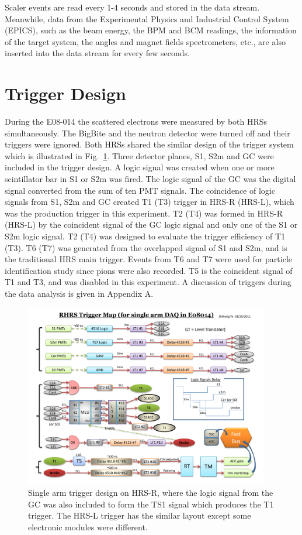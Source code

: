    Scaler events are read every 1-4 seconds and stored in the data stream. Meanwhile, data from the Experimental Physics and Industrial Control System (EPICS), such as the beam energy, the BPM and BCM readings, the information of the target system, the angles and magnet fields spectrometers, etc., are also inserted into the data stream for every few seconds.

\section{Trigger Design}
  During the E08-014 the scattered electrons were measured by both HRSs simultaneously. The BigBite and the neutron detector were turned off and their triggers were ignored. Both HRSs shared the similar design of the trigger system which is illustrated in Fig.~\ref{trigger_design}. Three detector planes, S1, S2m and GC were included in the trigger design. A logic signal was created when one or more scintillator bar in S1 or S2m was fired. The logic signal of the GC was the digital signal converted from the sum of ten PMT signals. The coincidence of logic signals from S1, S2m and GC created T1 (T3) trigger in HRS-R (HRS-L), which was the production trigger in this experiment. T2 (T4) was formed in HRS-R (HRS-L) by the coincident signal of the GC logic signal and only one of the S1 or S2m logic signal. T2 (T4) was designed to evaluate the trigger efficiency of T1 (T3). T6 (T7) was generated from the overlapped signal of S1 and S2m, and is the traditional HRS main trigger. Events from T6 and T7 were used for particle identification study since pions were also recorded. T5 is the coincident signal of T1 and T3, and was disabled in this experiment. A discussion of triggers during the data analysis is given in Appendix A.
  
\begin{figure}[!ht]
 \begin{center}
  \includegraphics[angle=90,width=0.95\textwidth]{./figures/trigger/trigger_design}
  \caption[Single arm trigger design]{\footnotesize{Single arm trigger design on HRS-R, where the logic signal from the GC was also included to form the TS1 signal which produces the T1 trigger. The HRS-L trigger has the similar layout except some electronic modules were different.}}
  \label{trigger_design}
 \end{center}
\end{figure}
